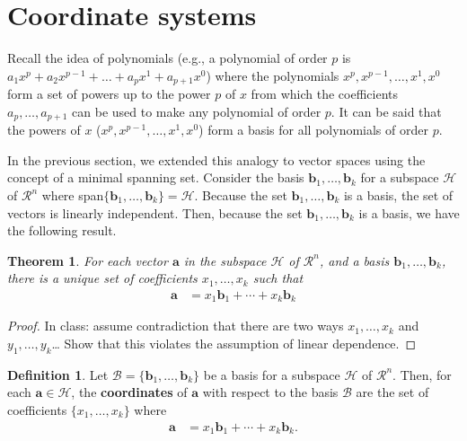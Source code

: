 \documentclass[
]{book}
\newtheorem{theorem}{Theorem}[chapter]
\theoremstyle{definition}
\newtheorem{definition}{Definition}[chapter]
\theoremstyle{definition}
\theoremstyle{definition}
\theoremstyle{definition}
\theoremstyle{remark}
\begin{document}
\hypertarget{coordinate-systems}{%
\section{Coordinate systems}\label{coordinate-systems}}

Recall the idea of polynomials (e.g., a polynomial of order \(p\) is \(a_1x^p + a_2x^{p-1} + \ldots + a_p x^1 + a_{p+1} x^0\)) where the polynomials \(x^p, x^{p-1}, \ldots, x^1, x^0\) form a set of powers up to the power \(p\) of \(x\) from which the coefficients \(a_p, \ldots, a_{p+1}\) can be used to make any polynomial of order \(p\). It can be said that the powers of \(x\) (\(x^p, x^{p-1}, \ldots, x^1, x^0\)) form a basis for all polynomials of order \(p\).

In the previous section, we extended this analogy to vector spaces using the concept of a minimal spanning set. Consider the basis \(\mathbf{b}_1, \ldots, \mathbf{b}_k\) for a subspace \(\mathcal{H}\) of \(\mathcal{R}^n\) where span\(\{\mathbf{b}_1, \ldots, \mathbf{b}_k\} = \mathcal{H}\). Because the set \(\mathbf{b}_1, \ldots, \mathbf{b}_k\) is a basis, the set of vectors is linearly independent. Then, because the set \(\mathbf{b}_1, \ldots, \mathbf{b}_k\) is a basis, we have the following result.

\begin{theorem}
For each vector \(\mathbf{a}\) in the subspace \(\mathcal{H}\) of \(\mathcal{R}^n\), and a basis \(\mathbf{b}_1, \ldots, \mathbf{b}_k\), there is a unique set of coefficients \(x_1, \ldots, x_k\) such that
\[
\begin{aligned}
\mathbf{a} & = x_1 \mathbf{b}_1 + \cdots + x_k \mathbf{b}_k
\end{aligned}
\]
\end{theorem}

\begin{proof}
In class: assume contradiction that there are two ways \(x_1, \ldots, x_k\) and \(y_1, \ldots, y_k\)\ldots{} Show that this violates the assumption of linear dependence.
\end{proof}

\begin{definition}
\protect\hypertarget{def:coordinates}{}\label{def:coordinates}Let \(\mathcal{B} = \{ \mathbf{b}_1, \ldots, \mathbf{b}_k\}\) be a basis for a subspace \(\mathcal{H}\) of \(\mathcal{R}^n\). Then, for each \(\mathbf{a} \in \mathcal{H}\), the \textbf{coordinates} of \(\mathbf{a}\) with respect to the basis \(\mathcal{B}\) are the set of coefficients \(\{x_1, \ldots, x_k\}\) where
\[
\begin{aligned}
\mathbf{a} & = x_1 \mathbf{b}_1 + \cdots + x_k \mathbf{b}_k.
\end{aligned}
\]
\end{definition}
\end{document}
